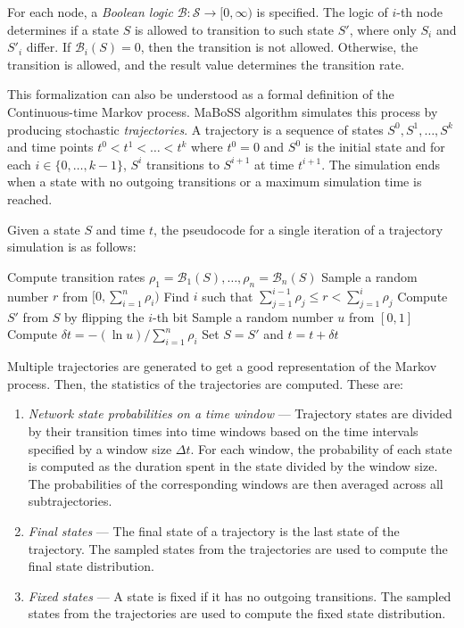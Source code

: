\documentclass[times, twoside]{zHenriquesLab-StyleBioRxiv}
\begin{document}
For each node, a \emph{Boolean logic} $\mathcal{B}: \mathcal{S} \rightarrow [0, \infty)$ is specified. The logic of $i$-th node determines if a state $S$ is allowed to transition to such state $S'$, where only $S_i$ and $S'_i$ differ. If $\mathcal{B}_i(S) = 0$, then the transition is not allowed. Otherwise, the transition is allowed, and the result value determines the transition rate.

This formalization can also be understood as a formal definition of the Continuous-time Markov process. MaBoSS algorithm simulates this process by producing stochastic \emph{trajectories}. A trajectory is a sequence of states $S^0, S^1, \dots, S^k$ and time points $t^0 < t^1 < \dots < t^k$ where $t^0 = 0$ and $S^0$ is the initial state and for each $i \in \{0, \dots, k-1\}$, $S^i$ transitions to $S^{i+1}$ at time $t^{i+1}$. The simulation ends when a state with no outgoing transitions or a maximum simulation time is reached.

Given a state $S$ and time $t$, the pseudocode for a single iteration of a trajectory simulation is as follows:
\begin{algorithmic}[1]
\State Compute transition rates $\rho_1 = \mathcal{B}_1(S), \dots, \rho_n = \mathcal{B}_n(S)$
\State Sample a random number $r$ from $[0, \sum_{i=1}^n \rho_i)$
\State Find $i$ such that $\sum_{j=1}^{i-1} \rho_j \leq r < \sum_{j=1}^{i} \rho_j$
\State Compute $S'$ from $S$ by flipping the $i$-th bit
\State Sample a random number $u$ from $[0, 1]$
\State Compute $\delta t = -(\ln u) / \sum_{i=1}^n \rho_i$
\State Set $S = S'$ and $t = t + \delta t$
\end{algorithmic}

Multiple trajectories are generated to get a good representation of the Markov process. Then, the statistics of the trajectories are computed. These are:

\begin{enumerate}
    \item \emph{Network state probabilities on a time window} --- Trajectory states are divided by their transition times into time windows based on the time intervals specified by a window size $\Delta t$. For each window, the probability of each state is computed as the duration spent in the state divided by the window size. The probabilities of the corresponding windows are then averaged across all subtrajectories.
    \item \emph{Final states} --- The final state of a trajectory is the last state of the trajectory. The sampled states from the trajectories are used to compute the final state distribution.
    \item \emph{Fixed states} --- A state is fixed if it has no outgoing transitions. The sampled states from the trajectories are used to compute the fixed state distribution.
\end{enumerate}
\end{document}
